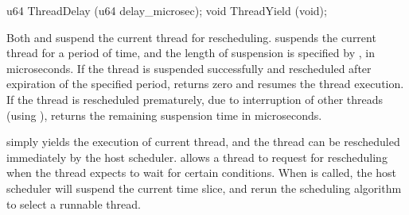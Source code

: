 


\begin{paldef}
u64  ThreadDelay (u64 delay_microsec);
void ThreadYield (void);
\end{paldef}


Both  and  suspend the current thread for rescheduling.
 suspends the current thread
for a period of time, and the length of suspension is specified by , in microseconds.
If the thread is suspended successfully and rescheduled after expiration of the specified period,
 returns zero and resumes the thread execution.
If the thread is rescheduled prematurely, due to interruption of other threads (using ),
 returns the remaining suspension time in microseconds.


 simply yields the execution of current thread, and the thread can be rescheduled immediately by the host scheduler.
 allows a thread to request for rescheduling when the thread expects
to wait for certain conditions.
When  is called, the host scheduler will suspend the current time slice,
and rerun the scheduling algorithm to select a runnable thread.








